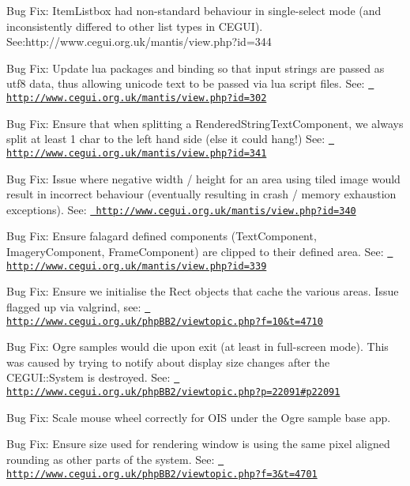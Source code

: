 \begin{DoxyItemize}
\item Bug Fix\+: Item\+Listbox had non-\/standard behaviour in single-\/select mode (and inconsistently differed to other list types in C\+E\+G\+UI). See\+:http\+://www.cegui.\+org.\+uk/mantis/view.php?id=344
\item Bug Fix\+: Update lua packages and binding so that input strings are passed as utf8 data, thus allowing unicode text to be passed via lua script files. See\+: \href{http://www.cegui.org.uk/mantis/view.php?id=302}{\texttt{ http\+://www.\+cegui.\+org.\+uk/mantis/view.\+php?id=302}}
\item Bug Fix\+: Ensure that when splitting a Rendered\+String\+Text\+Component, we always split at least 1 char to the left hand side (else it could hang!) See\+: \href{http://www.cegui.org.uk/mantis/view.php?id=341}{\texttt{ http\+://www.\+cegui.\+org.\+uk/mantis/view.\+php?id=341}}
\item Bug Fix\+: Issue where negative width / height for an area using tiled image would result in incorrect behaviour (eventually resulting in crash / memory exhaustion exceptions). See\+: \href{http://www.cegui.org.uk/mantis/view.php?id=340}{\texttt{ http\+://www.\+cegui.\+org.\+uk/mantis/view.\+php?id=340}}
\item Bug Fix\+: Ensure falagard defined components (Text\+Component, Imagery\+Component, Frame\+Component) are clipped to their defined area. See\+: \href{http://www.cegui.org.uk/mantis/view.php?id=339}{\texttt{ http\+://www.\+cegui.\+org.\+uk/mantis/view.\+php?id=339}}
\item Bug Fix\+: Ensure we initialise the Rect objects that cache the various areas. Issue flagged up via valgrind, see\+: \href{http://www.cegui.org.uk/phpBB2/viewtopic.php?f=10&t=4710}{\texttt{ http\+://www.\+cegui.\+org.\+uk/php\+B\+B2/viewtopic.\+php?f=10\&t=4710}}
\item Bug Fix\+: Ogre samples would die upon exit (at least in full-\/screen mode). This was caused by trying to notify about display size changes after the C\+E\+G\+U\+I\+::\+System is destroyed. See\+: \href{http://www.cegui.org.uk/phpBB2/viewtopic.php?p=22091\#p22091}{\texttt{ http\+://www.\+cegui.\+org.\+uk/php\+B\+B2/viewtopic.\+php?p=22091\#p22091}}
\item Bug Fix\+: Scale mouse wheel correctly for O\+IS under the Ogre sample base app.
\item Bug Fix\+: Ensure size used for rendering window is using the same pixel aligned rounding as other parts of the system. See\+: \href{http://www.cegui.org.uk/phpBB2/viewtopic.php?f=3&t=4701}{\texttt{ http\+://www.\+cegui.\+org.\+uk/php\+B\+B2/viewtopic.\+php?f=3\&t=4701}}

\end{DoxyItemize}
